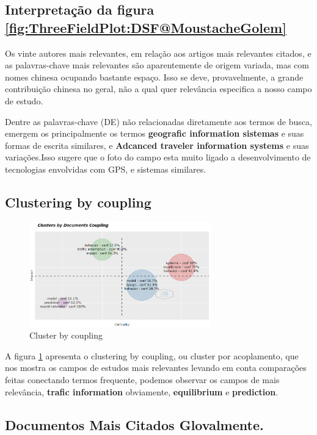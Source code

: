\subsection{Interpretação da figura \ref{fig:ThreeFieldPlot:DSF@MoustacheGolem}}
Os vinte autores mais relevantes, em relação aos artigos mais relevantes citados, e as palavras-chave mais relevantes são aparentemente de origem variada, mas com nomes chinesa ocupando bastante espaço. Isso se deve, provavelmente, a grande contribuição chinesa no geral, não a qual quer relevância especifica a nosso campo de estudo.

Dentre as palavras-chave (DE) não relacionadas diretamente aos termos de busca, emergem os principalmente os termos \textbf{geografic information sistemas} e suas formas de escrita similares, e \textbf{Adcanced traveler information systems} e suas variações.Isso sugere que o foto do campo esta muito ligado a desenvolvimento de tecnologias envolvidas com GPS, e sistemas similares.


\subsection{Clustering by coupling}

\begin{figure}
    \centering
    \includegraphics[width=0.7\textwidth]{experiments/MoustacheGolem/T1/img4ClusterByDocumentsCoupling.PNG}%
    \caption{Cluster by coupling}
    \label{fig:evol:Clusters:DSF@MoustacheGolem}
\end{figure}

A figura \ref{fig:evol:Clusters:DSF@MoustacheGolem} apresenta o clustering by coupling, ou cluster por acoplamento, que nos mostra os campos de estudos mais relevantes levando em conta comparações feitas conectando termos frequente, podemos observar os campos de mais relevância,   \textbf{trafic information} obviamente, \textbf{equilibrium} e \textbf{prediction}.
\newpage
\subsection{Documentos Mais Citados Glovalmente.}

